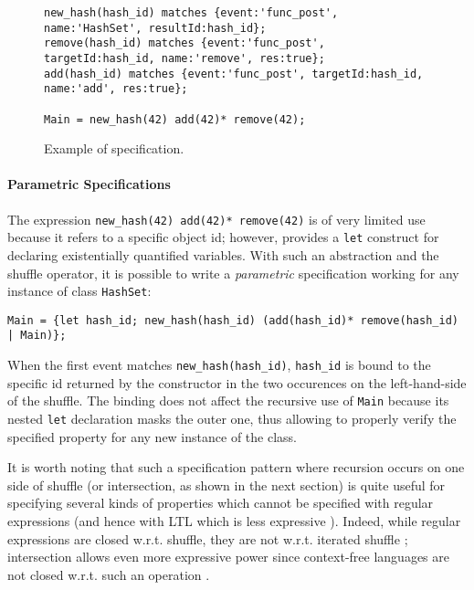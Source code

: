 \begin{figure}[h]
\begin{lstlisting}[basicstyle=\ttfamily\scriptsize]
new_hash(hash_id) matches {event:'func_post', name:'HashSet', resultId:hash_id};
remove(hash_id) matches {event:'func_post', targetId:hash_id, name:'remove', res:true};
add(hash_id) matches {event:'func_post', targetId:hash_id, name:'add', res:true};

Main = new_hash(42) add(42)* remove(42);
\end{lstlisting}
\caption{Example of specification.}\label{example}
\end{figure}

\paragraph{Parametric Specifications}
The expression \lstinline{new_hash(42) add(42)* remove(42)} is of very limited use because it refers to a specific object id;
however, \rml provides a \lstinline{let} construct \cite{AnconaFM17} for declaring existentially quantified variables.
With such an abstraction and the shuffle operator, it is possible to write a \emph{parametric} specification working for any instance of class \lstinline{HashSet}:
\begin{lstlisting}[basicstyle=\ttfamily\scriptsize]
Main = {let hash_id; new_hash(hash_id) (add(hash_id)* remove(hash_id) | Main)};
\end{lstlisting}
When the first event matches \lstinline{new_hash(hash_id)}, \lstinline{hash_id} is bound to the specific id returned by the constructor in the two
occurences on the left-hand-side of the shuffle. The binding does not affect the recursive use of \lstinline{Main}
because its nested \lstinline{let} declaration masks the outer one, thus allowing to properly verify the specified property
for any new instance of the class.

It is worth noting that such a specification pattern where recursion occurs on one side of shuffle (or intersection, as shown in the next section)
is quite useful for specifying several kinds of properties \cite{RML2021} which cannot be specified with regular expressions (and hence
with LTL which is less expressive \cite{Strejcek2004}). Indeed, while regular expressions are closed w.r.t. shuffle, they are not
w.r.t. iterated shuffle \cite{FlickK12}; intersection allows even more expressive power since context-free languages are not closed w.r.t. such an operation \cite{RML2021}.

